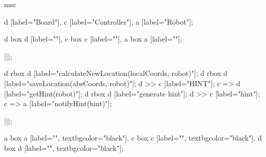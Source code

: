 \begin{msc}
msc
{

d [label="Board"],
c [label="Controller"],
a [label="Robot"];

d box d [label=""],
c box c [label=""],
a box a [label=""];

|||;

d rbox d [label="calculateNewLocation(localCoords, robot)"];
d rbox d [label="saveLocation(absCoords, robot)"];
d >> c [label="HINT"];
c => d [label="getHint(robot)"];
d rbox d [label="generate hint"];
d >> c [label="hint"];
c => a [label="notifyHint(hint)"];

|||;

a box a [label="", textbgcolor="black"],
c box c [label="", textbgcolor="black"],
d box d [label="", textbgcolor="black"];

}
\end{msc}

